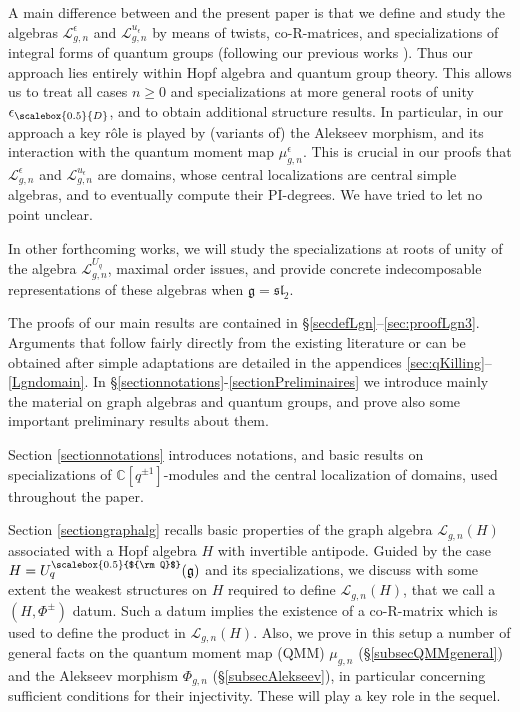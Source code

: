 \documentclass[11pt]{amsart}
\newcommand{\e}{\epsilon}
\newcommand{\mc}{\mathbb{C}}
\newcommand{\Ll}{\mathcal{L}}
\newcommand{\eD}{\epsilon_{\scalebox{0.5}{D}}}
\newcommand{\Q}{{\scalebox{0.5}{${\rm Q}$}}}
\begin{document}
A main difference between \cite{GJS} and the present paper is that we define and study the algebras $\Ll_{g,n}^{\e}$ and $\Ll_{g,n}^{u_\e}$ by means of twists, co-R-matrices, and specializations of integral forms of quantum groups (following our previous works \cite{BR1,BR2,BFR}). Thus our approach lies entirely within Hopf algebra and quantum group theory. This allows us to treat all cases $n\geq 0$ and specializations at more general roots of unity $\eD$, and to obtain additional structure results. In particular, in our approach a key r\^ole is played by (variants of) the Alekseev morphism, and its interaction with the quantum moment map $\mu_{g,n}^\e$. This is crucial in our proofs that $\Ll_{g,n}^{\e}$ and $\Ll_{g,n}^{u_\e}$ are domains, whose central localizations are central simple algebras, and to eventually compute their PI-degrees. We have tried to let no point unclear.

\smallskip

In other forthcoming works, we will study the specializations at roots of unity of the algebra $\Ll_{g,n}^{U_q}$, maximal order issues, and  provide concrete indecomposable representations of these algebras when $\mathfrak{g}=\mathfrak{sl}_2$. 

\medskip

 The proofs of our main results are contained in \S \ref{secdefLgn}--\ref{sec:proofLgn3}. Arguments that follow fairly directly from the existing literature or can be obtained after simple adaptations are detailed in the appendices \ref{sec:qKilling}--\ref{Lgndomain}. In \S \ref{sectionnotations}-\ref{sectionPreliminaires} we introduce mainly the material on graph algebras and quantum groups, and prove also some important preliminary results about them.

Section \ref{sectionnotations} introduces notations, and basic results on specializations of $\mc[q^{\pm 1}]$-modules and the central localization of domains, used throughout the paper.

Section \ref{sectiongraphalg} recalls basic properties of the graph algebra $\Ll_{g,n}(H)$ associated with a Hopf algebra $H$ with invertible antipode. Guided by the case $H=U_q^\Q(\mathfrak{g})$ and its specializations, we discuss with some extent the weakest structures on $H$ required to define $\Ll_{g,n}(H)$, that we call a $(H,\Phi^\pm)$ datum. Such a datum implies the existence of a co-R-matrix which is used to define the product in $\mathcal{L}_{g,n}(H)$. Also, we prove in this setup a number of general facts on the quantum moment map (QMM) $\mu_{g,n}$ (\S \ref{subsecQMMgeneral}) and the Alekseev morphism $\Phi_{g,n}$ (\S \ref{subsecAlekseev}), in particular concerning sufficient conditions for their injectivity. These will play a key role in the sequel.
\end{document}
